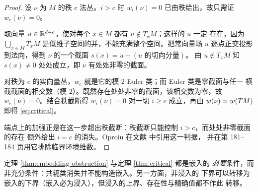 \begin{proof}
设 $\nu$ 为 $M$ 的秩 $c$ 法丛。$i>c$ 时 $w_i(\nu)=0$ 已由秩给出，故只需证
$w_c(\nu)=0$。

取向量 $u\in\mathbb{R}^{d+c}$，使对每个 $x\in M$ 都有 $u\notin T_xM$；这样的 $u$ 一定
存在，因为 $\bigcup_{x\in M}T_xM$ 是低维子空间的并，不能充满整个空间。把常向量场
$u$ 逐点正交投影到法向，得到 $\nu$ 的一个截面 $s(x)=u-(u\text{ 的切向分量})$。
由 $u\notin T_xM$ 知 $s(x)\neq0$ 处处成立，即 $\nu$ 有处处非零的截面。

对秩为 $c$ 的实向量丛，$w_c$ 就是它的模 $2$ Euler 类；而 Euler 类是零截面与任一
横截截面的相交数（模 $2$）。既然存在处处非零的截面，该相交数为零，故
$w_c(\nu)=0$。结合秩截断得 $w_i(\nu)=0$ 对一切 $i\ge c$ 成立，再由
$w(\nu)=\bar w(TM)$ 即得 \eqref{eq:critical}。

端点上的加强正是在这一步超出秩截断：秩截断只能控制 $i>c$，而处处非零截面的存在
额外给出 $i=c$ 的消失。Oproiu 在文献 \cite[p.~177]{Oproiu1977} 中引用这一判据，
并在第 181--184 页用它排除临界环境维数。
\end{proof}

\begin{remark}[两个定理的逻辑地位]
定理 \ref{thm:embedding-obstruction} 与定理 \ref{thm:critical} 都是嵌入的
\emph{必要}条件，而非充分条件：共轭类消失并不能构造嵌入。另一方面，非浸入的
下界可以转移为嵌入的下界（嵌入必为浸入），但浸入的上界、存在性与精确值都不作此
转移。
\end{remark}
